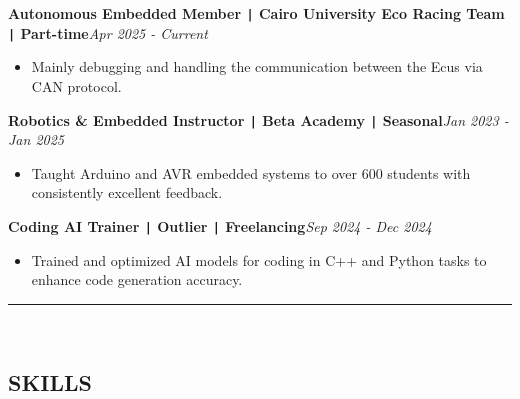 \documentclass[11pt,a4paper]{article}
\begin{document}
\begin{flushleft}
\textbf{Autonomous Embedded Member \texttt{|} Cairo University Eco Racing Team \texttt{|} Part-time}\hfill\textit{Apr 2025 - Current}\\
\end{flushleft}
\vspace{-0.7cm}
\begin{itemize}
\item \setlength{\itemsep}{-0.0em} Mainly debugging and handling the communication between the Ecus via CAN protocol.
\end{itemize}
\vspace{-0.7cm}
\begin{flushleft}
\textbf{Robotics \& Embedded Instructor \texttt{|} Beta Academy \texttt{|} Seasonal}\hfill\textit{Jan 2023 - Jan 2025}\\
\end{flushleft}
\vspace{-0.7cm}
\begin{itemize}
\item \setlength{\itemsep}{-0.0em} Taught Arduino and AVR embedded systems to over 600 students with consistently excellent feedback.
\end{itemize}
\vspace{-0.7cm}
\begin{flushleft}
\textbf{Coding AI Trainer \texttt{|} Outlier \texttt{|} Freelancing}\hfill\textit{Sep 2024 - Dec 2024}\\
\end{flushleft}
\vspace{-0.7cm}
\begin{itemize}
\item \setlength{\itemsep}{-0.0em} Trained and optimized AI models for coding in C++ and Python tasks to enhance code generation accuracy.
\end{itemize}
\vspace{-0.7cm}
\vspace{0.2cm}
\rule{\textwidth}{0.3pt}\\
\vspace{-0.9cm}
\begin{center}
\section*{\fontsize{14}{18}\textbf\selectfont SKILLS}
\end{center}
\vspace{-0.4cm}
\renewcommand{\arraystretch}{1.8} %
\end{document}

